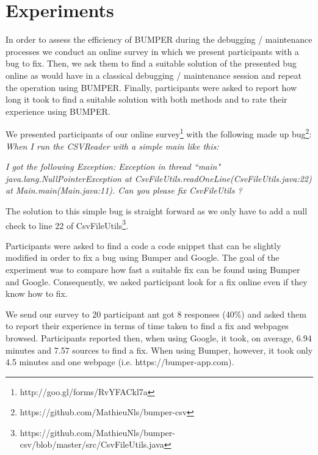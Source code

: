 \documentclass[conference]{IEEEtran}
\begin{document}
\section{Experiments}
\label{sec:Experiments}

In order to assess the efficiency of BUMPER during the debugging / maintenance processes we conduct an online survey in which we present participants with a bug to fix.
Then, we ask them to find a suitable solution of the presented bug online as would have in a classical debugging / maintenance session and repeat the operation using BUMPER.
Finally, participants were asked to report how long it took to find a suitable solution with both methods and to rate their experience using BUMPER.

We presented participants of our online survey\footnote{http://goo.gl/forms/RvYFACkl7a} with the following made up bug\footnote{https://github.com/MathieuNls/bumper-csv}: \textit{When I run the CSVReader with a simple main like this:}

\noindent\begin{minipage}{0.90\linewidth}

  

\end{minipage}

\textit{I got the following Exception: Exception in thread ``main" java.lang.NullPointerException at CsvFileUtils.readOneLine(CsvFileUtils.java:22) at Main.main(Main.java:11). Can you please fix CsvFileUtils ?}

The solution to this simple bug is straight forward as we only have to add a null check to line 22 of CsvFileUtils\footnote{https://github.com/MathieuNls/bumper-csv/blob/master/src/CsvFileUtils.java}.

Participants were asked to find a code a code snippet that can be slightly modified in order to fix a bug using Bumper and Google.
The goal of the experiment was to compare how fast a suitable fix can be found using Bumper and Google.
Consequently, we asked participant look for a fix online even if they know how to fix.

We send our survey to 20 participant ant got 8 responses (40\%) and asked them to report their experience in terms of time taken to find a fix and webpages browsed.
Participants reported then, when using Google, it took, on average, 6.94 minutes and 7.57 sources to find a fix.
When using Bumper, however, it took only 4.5 minutes and one webpage (i.e. https://bumper-app.com).
\end{document}
